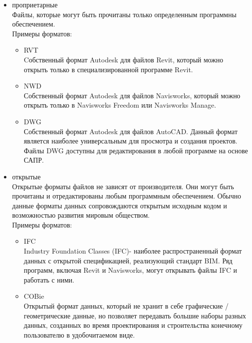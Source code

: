 \documentclass[a4paper,14pt]{extreport} %
\begin{document}
\begin{itemize}
\item проприетарные \\
Файлы, которые могут быть прочитаны только определенным программны обеспечением. \\
Примеры форматов:
	\begin{itemize}
	\item RVT \\
	Cобственный формат Autodesk для файлов Revit, который можно открыть только в специализированной программе Revit.
	\item NWD \\
	Собственный формат Autodesk для файлов Navisworks, который можно открыть только в Navisworks Freedom или Navisworks Manage.
	\item DWG \\
	Собственный формат Autodesk для файлов AutoCAD. Данный формат является наиболее универсальным для просмотра и создания проектов. Файлы DWG доступны для редактирования в любой программе на основе САПР.
	\end{itemize}
\item открытые \\
Открытые форматы файлов не зависят от производителя. Они могут быть прочитаны и отредактированы любым программным обеспечением. Обычно данные форматы данных сопровождаются открытым исходным кодом и возможностью развития мировым обществом. \\
Примеры форматов:
	\begin{itemize}
	\item IFC \\
	Industry Foundation Classes (IFC)- наиболее распространенный формат данных с открытой спецификацией, реализующий стандарт BIM. Ряд программ, включая Revit и Navisworks, могут открывать файлы IFC и работать с ними.
	\item COBie \\
	Открытый формат данных, который не хранит в себе графические / геометрические данные, но позволяет передавать большие наборы разных данных, созданных во время проектирования и строительства конечному пользователю в удобочитаемом виде.
	\end{itemize}
\end{itemize}
\end{document}
